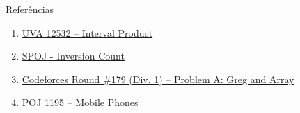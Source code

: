 \begin{frame}[fragile]{Referências}

    \begin{enumerate}
        \item \href{https://uva.onlinejudge.org/index.php?option=com_onlinejudge&Itemid=8&category=24&page=show_problem&problem=3977}{UVA 12532 -- Interval Product}

        \item \href{https://www.spoj.com/problems/INVCNT/}{SPOJ - Inversion Count}

        \item \href{https://codeforces.com/problemset/problem/295/A}{Codeforces Round \#179 (Div. 1) -- Problem A: Greg and Array}

        \item \href{http://poj.org/problem?id=1195}{POJ 1195 -- Mobile Phones}

    \end{enumerate}

\end{frame}

